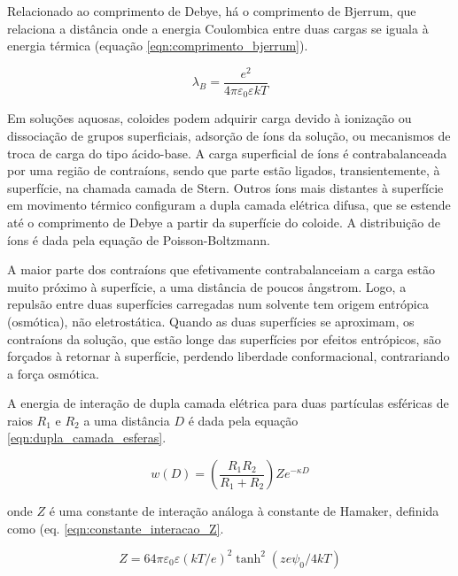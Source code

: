 	Relacionado ao comprimento de Debye, há o comprimento de Bjerrum, que relaciona a distância onde a energia Coulombica entre duas cargas se iguala à energia térmica (equação \ref{eqn:comprimento_bjerrum}).
	
	\begin{equation}
		\lambda_B = \dfrac{e^2}{4 \pi \varepsilon_{ 0 } \varepsilon kT}
		\label{eqn:comprimento_bjerrum}
	\end{equation} 
	
	Em soluções aquosas, coloides podem adquirir carga devido à ionização ou dissociação de grupos superficiais, adsorção de íons da solução, ou mecanismos de troca de carga do tipo ácido-base. A carga superficial de íons é contrabalanceada por uma região de contraíons, sendo que parte estão ligados, transientemente, à superfície, na chamada camada de Stern.  Outros íons mais distantes à superfície em movimento térmico configuram a dupla camada elétrica difusa, que se estende até o comprimento de Debye a partir da superfície do coloide. A distribuição de íons é dada pela equação de Poisson-Boltzmann.
	
	A maior parte dos contraíons que efetivamente contrabalanceiam a carga estão muito próximo à superfície, a uma distância de poucos \aa ngstrom. Logo, a repulsão entre duas superfícies carregadas num solvente tem origem entrópica (osmótica), não eletrostática. Quando as duas superfícies se aproximam, os contraíons da solução, que estão longe das superfícies por efeitos entrópicos, são forçados à retornar à superfície, perdendo liberdade conformacional, contrariando a força osmótica.
	
	A energia de interação de dupla camada elétrica para duas partículas esféricas de raios \(R_1\) e \(R_2\) a uma distância \(D\) é dada pela equação \ref{eqn:dupla_camada_esferas}.
	
	\begin{equation}
		w(D) = \left(  \dfrac{R_1R_2}{R_1+R_2}  \right)Ze^{-\kappa D}
		\label{eqn:dupla_camada_esferas}
	\end{equation} 
	
	\noindent onde \(Z\) é uma constante de interação análoga à constante de Hamaker, definida como (eq. \ref{eqn:constante_interacao_Z}.
	
	\begin{equation}
		Z = 64 \pi \varepsilon _ { 0 } \varepsilon ( k T / e ) ^ { 2 } \tanh ^ { 2 } \left( z e \psi _ { 0 } / 4 k T \right)
		\label{eqn:constante_interacao_Z}
	\end{equation} 
	
